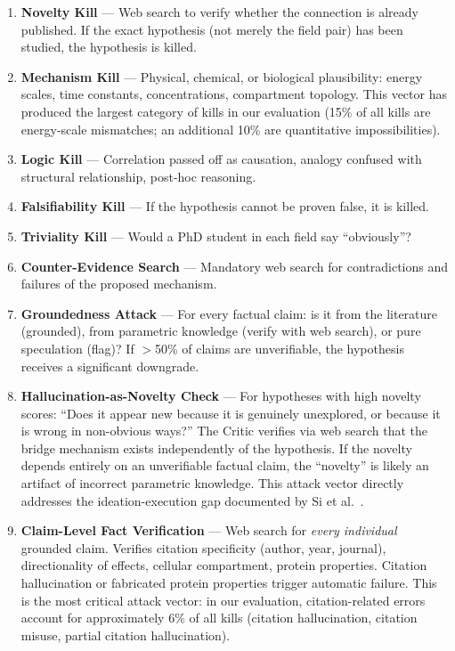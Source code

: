 \begin{enumerate}
    \item \textbf{Novelty Kill} --- Web search to verify whether the connection is already published. If the exact hypothesis (not merely the field pair) has been studied, the hypothesis is killed.

    \item \textbf{Mechanism Kill} --- Physical, chemical, or biological plausibility: energy scales, time constants, concentrations, compartment topology. This vector has produced the largest category of kills in our evaluation (15\% of all kills are energy-scale mismatches; an additional 10\% are quantitative impossibilities).

    \item \textbf{Logic Kill} --- Correlation passed off as causation, analogy confused with structural relationship, post-hoc reasoning.

    \item \textbf{Falsifiability Kill} --- If the hypothesis cannot be proven false, it is killed.

    \item \textbf{Triviality Kill} --- Would a PhD student in each field say ``obviously''?

    \item \textbf{Counter-Evidence Search} --- Mandatory web search for contradictions and failures of the proposed mechanism.

    \item \textbf{Groundedness Attack} --- For every factual claim: is it from the literature (grounded), from parametric knowledge (verify with web search), or pure speculation (flag)? If $>$50\% of claims are unverifiable, the hypothesis receives a significant downgrade.

    \item \textbf{Hallucination-as-Novelty Check} --- For hypotheses with high novelty scores: ``Does it appear new because it is genuinely unexplored, or because it is wrong in non-obvious ways?'' The Critic verifies via web search that the bridge mechanism exists independently of the hypothesis. If the novelty depends entirely on an unverifiable factual claim, the ``novelty'' is likely an artifact of incorrect parametric knowledge. This attack vector directly addresses the ideation-execution gap documented by Si et al.~\citep{si2025}.

    \item \textbf{Claim-Level Fact Verification} --- Web search for \emph{every individual} grounded claim. Verifies citation specificity (author, year, journal), directionality of effects, cellular compartment, protein properties. Citation hallucination or fabricated protein properties trigger automatic failure. This is the most critical attack vector: in our evaluation, citation-related errors account for approximately 6\% of all kills (citation hallucination, citation misuse, partial citation hallucination).
\end{enumerate}


